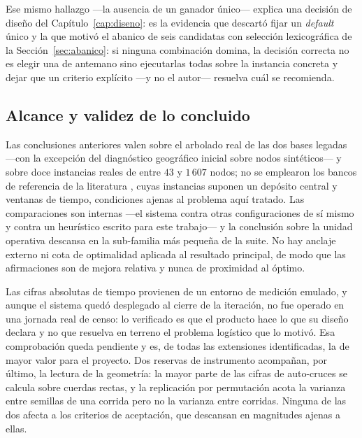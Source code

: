 Ese mismo hallazgo ---la ausencia de un ganador único--- explica una decisión de diseño del
Capítulo~\ref{cap:diseno}: es la evidencia que descartó fijar un \textit{default} único y la que motivó el abanico de
seis candidatas con selección lexicográfica de la Sección~\ref{sec:abanico}: si ninguna combinación
domina, la decisión correcta no es elegir una de antemano sino ejecutarlas todas sobre la instancia
concreta y dejar que un criterio explícito ---y no el autor--- resuelva cuál se recomienda.

\subsection{Alcance y validez de lo concluido}

Las conclusiones anteriores valen sobre el arbolado real de las dos bases legadas ---con la
excepción del diagnóstico geográfico inicial sobre nodos sintéticos--- y sobre doce instancias
reales de entre $43$ y $1\,607$ nodos; no se emplearon los bancos de referencia de la literatura
\citep{solomon1987algorithms}, cuyas instancias suponen un depósito central y ventanas de tiempo,
condiciones ajenas al problema aquí tratado. Las comparaciones son internas ---el sistema contra
otras configuraciones de sí mismo y contra un heurístico escrito para este trabajo--- y la
conclusión sobre la unidad operativa descansa en la sub-familia más pequeña de la suite. No hay
anclaje externo ni cota de optimalidad aplicada al resultado principal, de modo que las
afirmaciones son de mejora relativa y nunca de proximidad al óptimo.

Las cifras absolutas de tiempo provienen de un entorno de medición emulado, y aunque el sistema
quedó desplegado al cierre de la iteración, no fue operado en una jornada real de censo: lo
verificado es que el producto hace lo que su diseño declara y no que resuelva en terreno el
problema logístico que lo motivó. Esa comprobación queda pendiente y es, de todas las extensiones
identificadas, la de mayor valor para el proyecto. Dos reservas de instrumento acompañan, por
último, la lectura de la geometría: la mayor parte de las cifras de auto-cruces se calcula sobre
cuerdas rectas, y la replicación por permutación
acota la varianza entre semillas de una corrida pero no la varianza entre corridas. Ninguna de las
dos afecta a los criterios de aceptación, que descansan en magnitudes ajenas a ellas.